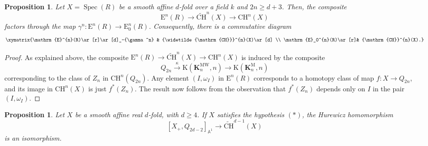 \documentclass[11pt,leqno]{amsart}
\newcommand{\Spec}{\operatorname{Spec}}
\newcommand{\A}{{\mathbb A}}
\renewcommand{\1}{{\rm 1\hspace*{-0.4ex}%
\rule{0.1ex}{1.52ex}\hspace*{0.2ex}}}
\newcommand{\CHW}{{\widetilde{\mathrm{CH}}}}
\newcommand{\CH}{{\mathrm{CH}}}
\newcommand{\K}{{{\mathbf K}}}
\newcommand{\KMW}{\K^{\mathrm{MW}}}
\newcommand{\KM}{\K^{\mathrm M}}
\newcommand{\<}[1]{{\langle}#1 {\rangle}}
\newcommand{\Er}{\mathrm{E}}
\theoremstyle{plain}
\newtheorem{prop}[thm]{Proposition}
\theoremstyle{definition}
\theoremstyle{remark}
\numberwithin{equation}{section}
\begin{document}
\begin{prop}
  Let $X=\Spec(R)$ be a smooth affine $d$-fold over a field $k$ and $2n\ge d+3$. Then, the composite
\[
\Er^n(R)\to \CHW^{n}(X)\to  \CH^{n}(X)
\]
factors through the map $\gamma^n\colon \Er^n(R)\to \Er^n_0(R)$. Consequently, there is a commutative diagram
\[
\xymatrix{\Er^{n}(R)\ar[r]\ar[d]_-{\gamma^n} & \CHW^{n}(X)\ar[d] \\
\Er_0^{n}(R)\ar[r]& \CH^{n}(X).}
\]
\end{prop}


\begin{proof}
As explained above, the composite $\Er^n(R)\to \CHW^n(X)\to \CH^n(X)$ is induced by the composite
\[
Q_{2n}\xrightarrow{\kappa} \mathrm{K}(\KMW_n,n)\to \mathrm{K}(\KM_n,n)
\]
corresponding to the class of $Z_n$ in $\CH^n(Q_{2n})$. Any element $(I,\omega_I)$ in $\Er^n(R)$ corresponds to a homotopy class of map $f\colon X\to Q_{2n}$, and its image in $\CH^n(X)$ is just $f^*(Z_n)$. The result now follows from the observation that $f^*(Z_n)$ depends only on $I$ in the pair $(I,\omega_I)$.
\end{proof}
    


\begin{prop}
Let $X$ be a smooth affine real $d$-fold, with $d\geq 4$. If $X$ satisfies the hypothesis $(*)$, the Hurewicz homomorphism 
\[
[X_+,Q_{2d-2}]_{\A^1}\to \CHW^{d-1}(X)
\]
is an isomorphism. 
\end{prop}
\end{document}
